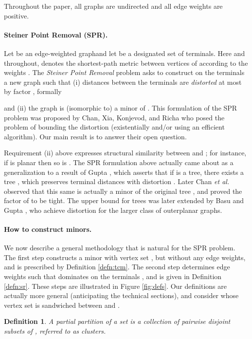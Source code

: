 \documentclass[twoside,leqno,twocolumn]{article}
\newtheorem{definition}[Definition]{Definition}
\newtheorem{definition}[theorem]{Definition}
\newcommand{\etal}{{\em et al.\ }\xspace}
\begin{document}
Throughout the paper, all graphs are undirected and all edge weights are positive.

\paragraph{Steiner Point Removal (SPR).}
Let  be an edge-weighted graphand let  be a designated set of  terminals.
Here and throughout,  denotes the shortest-path metric 
between vertices of  according to the weights .
The \emph{Steiner Point Removal} problem asks to construct on the terminals
a new graph  such that
(i)  
distances between the terminals are \emph{distorted} at most 
by factor , formally

and (ii) the graph  is (isomorphic to) a minor of .
This formulation of the SPR problem was proposed by
Chan, Xia, Konjevod, and Richa \cite[Section 5]{CXKR06}
who posed the problem of bounding the distortion 
(existentially and/or using an efficient algorithm).
Our main result is to answer their open question.

Requirement (ii) above expresses structural similarity between  and ; 
for instance, if  is planar then so is .
The SPR formulation above actually came about as a generalization 
to a result of Gupta \cite{Gupta01}, which
asserts that if  is a tree, there exists a tree , which preserves terminal distances with distortion .
Later Chan \etal \cite{CXKR06} observed that this same  
is actually a minor of the original tree ,
and proved the factor of  to be tight.
The upper bound for trees was later extended by Basu and Gupta \cite{BG08},
who achieve distortion  for the larger class of outerplanar graphs.



\paragraph{How to construct minors.}

We now describe a general methodology that is natural for the SPR problem.
The first step constructs a minor  with vertex set , 
but without any edge weights,
and is prescribed by Definition \ref{defn:tcm}.
The second step determines edge weights  
such that  dominates  on the terminals ,
and is given in Definition \ref{defn:sr}.
These steps are illustrated in Figure \ref{fig:defs}.
Our definitions are actually more general (anticipating the technical sections),
and consider  whose vertex set is sandwiched between  and .
\begin{definition}
A \emph{partial partition} of a set  is a collection  
of pairwise disjoint subsets of , referred to as {\em clusters}.
\end{definition}
\end{document}
